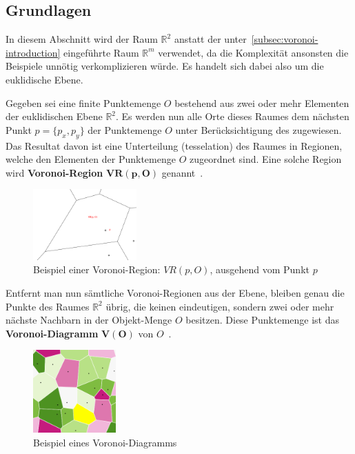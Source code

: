 \subsection{Grundlagen}

In diesem Abschnitt wird der Raum $\mathbb{R}^2$ anstatt der unter~\ref{subsec:voronoi-introduction} eingeführte Raum $\mathbb{R}^m$ verwendet, da die Komplexität ansonsten die Beispiele unnötig verkomplizieren würde. Es handelt sich dabei also um die euklidische Ebene.

Gegeben sei eine finite Punktemenge $O$ bestehend aus zwei oder mehr Elementen der euklidischen Ebene $\mathbb{R}^2$. Es werden nun alle Orte dieses Raumes dem nächsten Punkt $p = \{p_x, p_y\}$ der Punktemenge $O$ unter Berücksichtigung des  zugewiesen. Das Resultat davon ist eine Unterteilung (\gls{tesselation}) des Raumes in Regionen, welche den Elementen der Punktemenge $O$ zugeordnet sind. Eine solche Region wird \textbf{Voronoi-Region} $\bm{VR(p, O)}$ genannt~\parencite[S. 44]{atsuyuki2000spatialtessellations}.

\begin{figure}[h]
\centering
\includegraphics[width=150px]{images/voronoi_region_example_01.png}
\caption{Beispiel einer Voronoi-Region: $VR(p, O)$, ausgehend vom Punkt $p$\protect\footnotemark}
\label{fig:voronoiRegionExample01}
\end{figure}


Entfernt man nun sämtliche Voronoi-Regionen aus der Ebene, bleiben genau die Punkte des Raumes $\mathbb{R}^2$ übrig, die keinen eindeutigen, sondern zwei oder mehr nächste Nachbarn in der Objekt-Menge $O$ besitzen. Diese Punktemenge ist das \textbf{Voronoi-Diagramm} $\bm{V(O)}$ von $O$~\parencite[S. 212]{klein2005algorithmischegeometrie}.

\begin{figure}[h]
\centering
\includegraphics[width=120px]{images/voronoi_example_01.png}
\caption{Beispiel eines Voronoi-Diagramms\protect\footnotemark}
\label{fig:voronoiExample01}
\end{figure}

